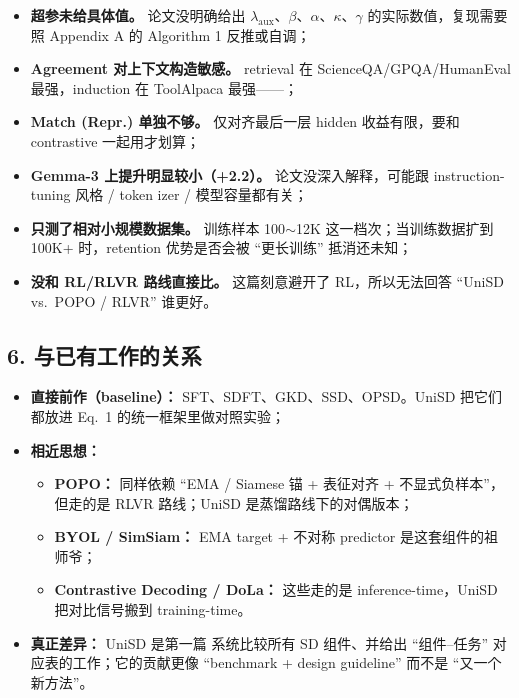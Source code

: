 \begin{itemize}[leftmargin=1.5em]
  \item \textbf{超参未给具体值。} 论文没明确给出 $\lambda_{\text{aux}}$、$\beta$、$\alpha$、$\kappa$、$\gamma$ 的实际数值，复现需要照 Appendix A 的 Algorithm 1 反推或自调；
  \item \textbf{Agreement 对上下文构造敏感。} retrieval 在 ScienceQA/GPQA/HumanEval 最强，induction 在 ToolAlpaca 最强——；
  \item \textbf{Match (Repr.) 单独不够。} 仅对齐最后一层 hidden 收益有限，要和 contrastive 一起用才划算；
  \item \textbf{Gemma-3 上提升明显较小（+2.2）。} 论文没深入解释，可能跟 instruction-tuning 风格 / token izer / 模型容量都有关；
  \item \textbf{只测了相对小规模数据集。} 训练样本 100$\sim$12K 这一档次；当训练数据扩到 100K+ 时，retention 优势是否会被 ``更长训练'' 抵消还未知；
  \item \textbf{没和 RL/RLVR 路线直接比。} 这篇刻意避开了 RL，所以无法回答 ``UniSD vs.\ POPO / RLVR'' 谁更好。
\end{itemize}

\subsection{6. 与已有工作的关系}

\begin{itemize}[leftmargin=1.5em]
  \item \textbf{直接前作（baseline）：} SFT、SDFT、GKD、SSD、OPSD。UniSD 把它们都放进 Eq.~1 的统一框架里做对照实验；
  \item \textbf{相近思想：}
    \begin{itemize}[leftmargin=1.5em]
      \item \textbf{POPO：} 同样依赖 ``EMA / Siamese 锚 + 表征对齐 + 不显式负样本''，但走的是 RLVR 路线；UniSD 是蒸馏路线下的对偶版本；
      \item \textbf{BYOL / SimSiam：} EMA target + 不对称 predictor 是这套组件的祖师爷；
      \item \textbf{Contrastive Decoding / DoLa：} 这些走的是 inference-time，UniSD 把对比信号搬到 training-time。
    \end{itemize}
  \item \textbf{真正差异：} UniSD 是第一篇  系统比较所有 SD 组件、并给出 ``组件--任务'' 对应表的工作；它的贡献更像 ``benchmark + design guideline'' 而不是 ``又一个新方法''。
\end{itemize}

